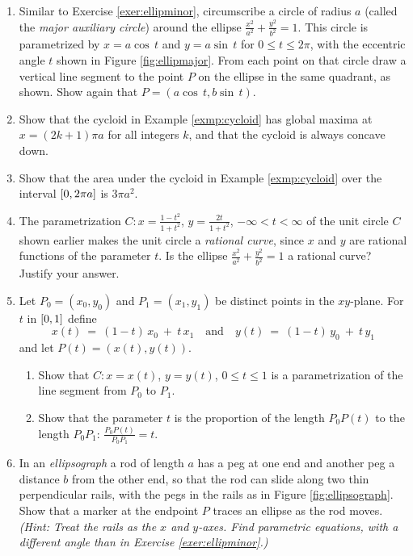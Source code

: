 {\begin{enumerate}[\bfseries 1.]
 \item\label{exer:ellipmajor} Similar to Exercise \ref{exer:ellipminor},
  circumscribe a circle of radius $a$ (called the \emph{major auxiliary circle})
  around the ellipse $\frac{x^2}{a^2}+\frac{y^2}{b^2}=1$. This circle is
  parametrized by $x=a \cos\,t$ and $y=a \sin\,t$ for $0 \le t \le 2\pi$, with
  the eccentric angle $t$ shown in Figure \ref{fig:ellipmajor}. From each point
  on that circle draw a vertical line segment to the point $P$ on the ellipse in
  the same quadrant, as shown. Show again that
  $P=(a \cos\,t,b \sin\,t)$.
 \item Show that the cycloid in Example \ref{exmp:cycloid} has global
  maxima at $x=(2k+1)\pi a$ for all integers $k$, and that the cycloid is always
  concave down.
 \item Show that the area under the cycloid in Example \ref{exmp:cycloid}
  over the interval $\lbrack 0,2\pi a \rbrack$ is $3\pi a^2$.
 \item\label{exer:ratcurve} The parametrization $C: x=\frac{1-t^2}{1+t^2}$,
  $y=\frac{2t}{1+t^2}$, $-\infty < t < \infty$ of the unit circle $C$ shown
  earlier makes the unit circle a \emph{rational curve}, since $x$ and $y$ are
  rational functions of the parameter $t$. Is the ellipse
  $\frac{x^2}{a^2}+\frac{y^2}{b^2}=1$ a rational curve? Justify your answer.
 \item\label{exer:paramsegment} Let $P_0=(x_0,y_0)$ and $P_1=(x_1,y_1)$ be
  distinct points in the $xy$-plane. For $t$ in $\lbrack 0,1 \rbrack$ define
\[
x(t) ~=~ (1-t)\,x_0 ~+~ t\,x_1 \quad\text{and}\quad
y(t) ~=~ (1-t)\,y_0 ~+~ t\,y_1
\]
and let $P(t)=(x(t),y(t))$.
\begin{enumerate}[\bfseries (a)]
 \item Show that $C: x=x(t)$, $y=y(t)$, $0 \le t \le 1$ is a parametrization of
  the line segment from $P_0$ to $P_1$.
 \item Show that the parameter $t$ is the proportion of the length
  $P_0P(t)$ to the length $P_0P_1$:
  $\frac{P_0P(t)}{P_0P_1} = t$.
\end{enumerate}
 \item\label{exer:ellipsograph} In an \emph{ellipsograph} a
  rod of length $a$ has a peg at one end and another peg a distance $b$ from the
  other end, so that the rod can slide along two thin perpendicular rails, with
  the pegs in the rails as in Figure \ref{fig:ellipsograph}. Show that a marker
  at the endpoint $P$ traces an ellipse as the rod moves. \emph{(Hint: Treat the
  rails as the $x$ and $y$-axes. Find parametric equations, with a different
  angle than in Exercise \ref{exer:ellipminor}.)}\vspace{-2mm}


\end{enumerate}}
